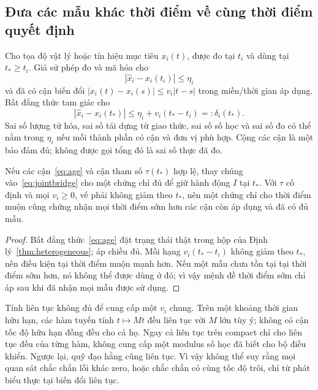 \subsection{Đưa các mẫu khác thời điểm về cùng thời điểm quyết định}
Cho tọa độ vật lý hoặc tín hiệu mục tiêu $x_i(t)$, được đo tại $t_i$ và dùng tại $t_*\ge t_i$. Giả sử phép đo và mã hóa cho
\[
|\widehat x_i-x_i(t_i)|\le\eta_i
\]
và đã có cận biến đổi $|x_i(t)-x_i(s)|\le v_i|t-s|$ trong miền/thời gian áp dụng. Bất đẳng thức tam giác cho
\begin{equation}\label{eq:age}
|\widehat x_i-x_i(t_*)|\le\eta_i+v_i(t_*-t_i)=:\delta_i(t_*).
\end{equation}
Sai số lượng tử hóa, sai số tái dựng từ giao thức, sai số số học và sai số đo có thể nằm trong $\eta_i$ nếu mỗi thành phần có cận và đơn vị phù hợp. Cộng các cận là một bảo đảm đủ; không được gọi tổng đó là sai số thực đã đo.

\begin{corollary}\label{cor:deadlinecertificate}
Nếu các cận~\eqref{eq:age} và cận tham số $\tau(t_*)$ hợp lệ, thay chúng vào~\eqref{eq:jointbridge} cho một chứng chỉ đủ để giữ hành động $I$ tại $t_*$. Với $\tau$ cố định và mọi $v_i\ge0$, vế phải không giảm theo $t_*$, nên một chứng chỉ cho thời điểm muộn cũng chứng nhận mọi thời điểm sớm hơn các cận còn áp dụng và đã có đủ mẫu.
\end{corollary}
\begin{proof}
Bất đẳng thức~\eqref{eq:age} đặt trạng thái thật trong hộp của Định lý~\ref{thm:heterogeneous}; áp chiều đủ. Mỗi hạng $v_i(t_*-t_i)$ không giảm theo $t_*$, nên điều kiện tại thời điểm muộn mạnh hơn. Nếu một mẫu chưa tồn tại tại thời điểm sớm hơn, nó không thể được dùng ở đó; vì vậy mệnh đề thời điểm sớm chỉ áp sau khi đã nhận mọi mẫu được sử dụng.
\end{proof}
Tính liên tục không đủ để cung cấp một $v_i$ chung. Trên một khoảng thời gian hữu hạn, các hàm tuyến tính $t\mapsto Mt$ đều liên tục với $M$ lớn tùy ý; không có cận tốc độ hữu hạn đồng đều cho cả họ. Ngay cả liên tục trên compact chỉ cho liên tục đều của từng hàm, không cung cấp một modulus số học đã biết cho bộ điều khiển. Ngược lại, quỹ đạo hằng cũng liên tục. Vì vậy không thể suy rằng mọi quan sát chắc chắn lỗi khác zero, hoặc chắc chắn có cùng tốc độ trôi, chỉ từ phát biểu thực tại biến đổi liên tục.

